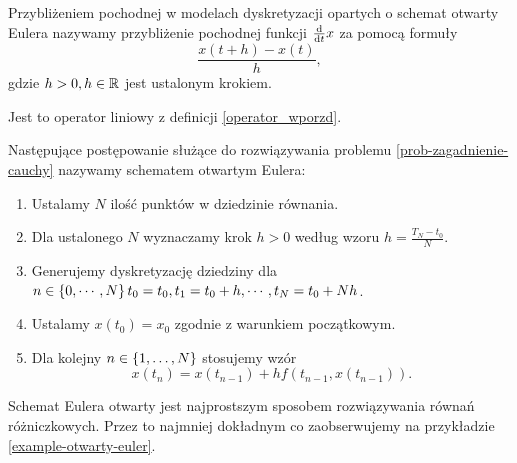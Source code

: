 \documentclass[12pt,a4paper]{report}
\begin{document}
\begin{definition}
Przybliżeniem pochodnej w modelach dyskretyzacji opartych o schemat otwarty Eulera nazywamy przybliżenie pochodnej funkcji $\frac{\mathrm{d} {} }{\mathrm{d}{t}}x$ za pomocą formuły 
$$
 \frac{x(t+h) - x(t)}{h},
$$
gdzie $h >0, h \in \mathbb{R} $ jest ustalonym krokiem. 
\end{definition}
Jest to operator liniowy z definicji \ref{operator_wporzd}. 
\begin{algorithm}\label{Euler_algoritm}
Następujące postępowanie służące do rozwiązywania problemu \ref{prob-zagadnienie-cauchy} nazywamy schematem otwartym Eulera:
\begin{enumerate}
\item Ustalamy $N$ ilość punktów w dziedzinie równania. 
\item Dla ustalonego $N$ wyznaczamy krok $h>0$ według wzoru $h=\frac{T_N - t_0}{N}$. 
\item Generujemy dyskretyzację dziedziny dla $ n \in \left\lbrace {0,\cdots,N} \right\rbrace  t_0 = t_0, t_1 = t_0 + h, \cdots, t_N = t_{0}+ Nh$. 
\item Ustalamy $x(t_0) = x_0$ zgodnie z warunkiem początkowym.
\item Dla kolejny $n \in \left\lbrace {1, \ldots, N} \right\rbrace$ stosujemy wzór
$$
x(t_{n}) = x(t_{n-1}) + h f(t_{n-1}, x(t_{n-1})).
$$
\end{enumerate}
\end{algorithm}
Schemat Eulera otwarty jest najprostszym sposobem rozwiązywania równań różniczkowych. Przez to najmniej dokładnym co zaobserwujemy na przykładzie \ref{example-otwarty-euler}. 
\end{document}
